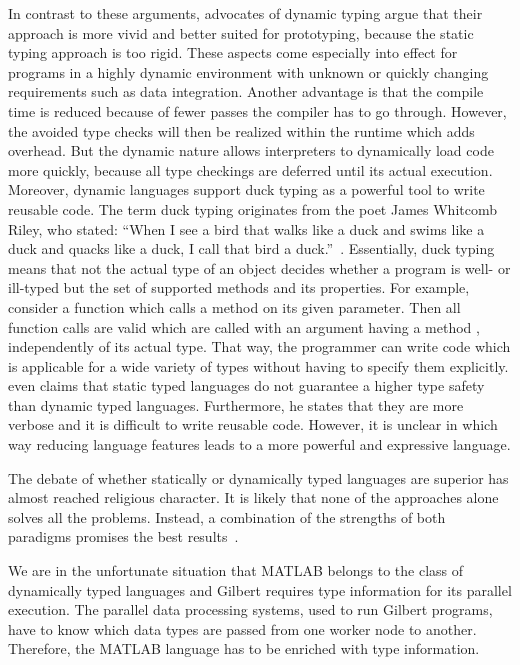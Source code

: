 In contrast to these arguments, advocates of dynamic typing argue that their approach is more vivid and better suited for prototyping, because the static typing approach is too rigid.
These aspects come especially into effect for programs in a highly dynamic environment with unknown or quickly changing requirements such as data integration.
Another advantage is that the compile time is reduced because of fewer passes the compiler has to go through.
However, the avoided type checks will then be realized within the runtime which adds overhead.
But the dynamic nature allows interpreters to dynamically load code more quickly, because all type checkings are deferred until its actual execution.
Moreover, dynamic languages support duck typing as a powerful tool to write reusable code.
The term duck typing originates from the poet James Whitcomb Riley, who stated: \enquote{When I see a bird that walks like a duck and swims like a duck and quacks like a duck, I call that bird a duck.}~\cite{heim:2007a}.
Essentially, duck typing means that not the actual type of an object decides whether a program is well- or ill-typed but the set of supported methods and its properties.
For example, consider a function which calls a method  on its given parameter.
Then all function calls are valid which are called with an argument having a method , independently of its actual type.
That way, the programmer can write code which is applicable for a wide variety of types without having to specify them explicitly.
\textcite{ousterhout:c1998a} even claims that static typed languages do not guarantee a higher type safety than dynamic typed languages.
Furthermore, he states that they are more verbose and it is difficult to write reusable code.
However, it is unclear in which way reducing language features leads to a more powerful and expressive language. 

The debate of whether statically or dynamically typed languages are superior has almost reached religious character.
It is likely that none of the approaches alone solves all the problems.
Instead, a combination of the strengths of both paradigms promises the best results~\cite{meijer:2004a}.

We are in the unfortunate situation that MATLAB belongs to the class of dynamically typed languages and Gilbert requires type information for its parallel execution.
The parallel data processing systems, used to run Gilbert programs, have to know which data types are passed from one worker node to another.
Therefore, the MATLAB language has to be enriched with type information.

